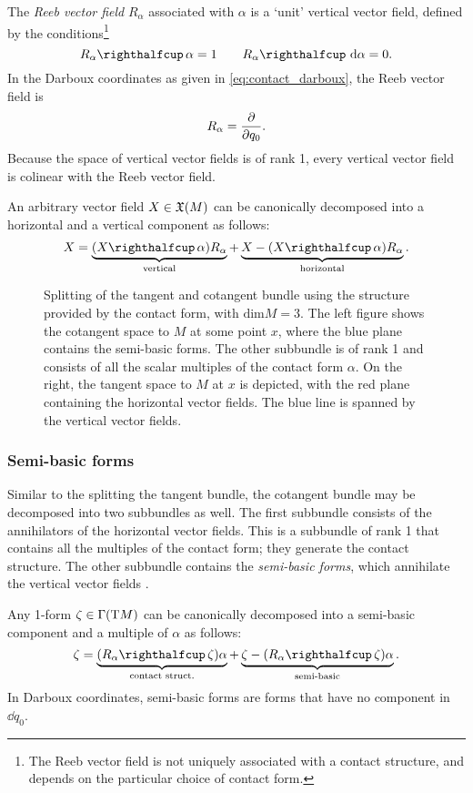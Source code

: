 The \emph{Reeb vector field} $R_\alpha$ associated with $\alpha$ is a `unit' vertical vector field, defined by the conditions\footnote{The Reeb vector field is not uniquely associated with a contact structure, and depends on the particular choice of contact form.}
    $$ \intpr{R_\alpha}{\alpha} = 1 \qquad \intpr{R_\alpha}{\dd{\alpha}} = 0.$$
In the Darboux coordinates as given in \cref{eq:contact_darboux}, the Reeb vector field is
    $$ R_\alpha = \pdv{}{q_0}. $$ 
Because the space of vertical vector fields is of rank 1, every vertical vector field is colinear with the Reeb vector field.

An arbitrary vector field $X \in \mathfrak{X}\qty(M)$ can be canonically decomposed into a horizontal and a vertical component as follows:
\begin{equation}
    X = \underbrace{(\intpr{X}{\alpha})R_\alpha}_\text{vertical} + \underbrace{X - (\intpr{X}{\alpha})R_\alpha}_\text{horizontal}.
    \label{eq:vfield_splitting}
\end{equation}

\begin{figure}[ht!]
    \centering
    
    \caption{Splitting of the tangent and cotangent bundle using the structure provided by the contact form, with $\text{dim} M = 3$. The left figure shows the cotangent space to $M$ at some point $x$, where the blue plane contains the semi-basic forms. The other subbundle is of rank 1 and consists of all the scalar multiples of the contact form $\alpha$. On the right, the tangent space to $M$ at $x$ is depicted, with the red plane containing the horizontal vector fields. The blue line is spanned by the vertical vector fields.}
    \label{fig:contact_spaces}
\end{figure}

\subsubsection{Semi-basic forms} 
Similar to the splitting the tangent bundle, the cotangent bundle may be decomposed into two subbundles as well. The first subbundle consists of the annihilators of the horizontal vector fields. This is a subbundle of rank 1 that contains all the multiples of the contact form; they generate the contact structure. The other subbundle contains the \emph{semi-basic forms}, which annihilate the vertical vector fields \cite{Libermann1987}.

Any 1-form $\zeta \in \mathrm{\Gamma}\qty(\mathrm{T}M)$ can be canonically decomposed into a semi-basic component and a multiple of $\alpha$ as follows:
\begin{equation}
    \zeta = \underbrace{(\intpr{R_\alpha}{\zeta})\alpha}_\text{contact struct.} + \underbrace{\zeta - (\intpr{R_\alpha}{\zeta})\alpha}_\text{semi-basic}. 
    \label{eq:form_splitting}
\end{equation}
In Darboux coordinates, semi-basic forms are forms that have no component in $\dd{q_0}$.

